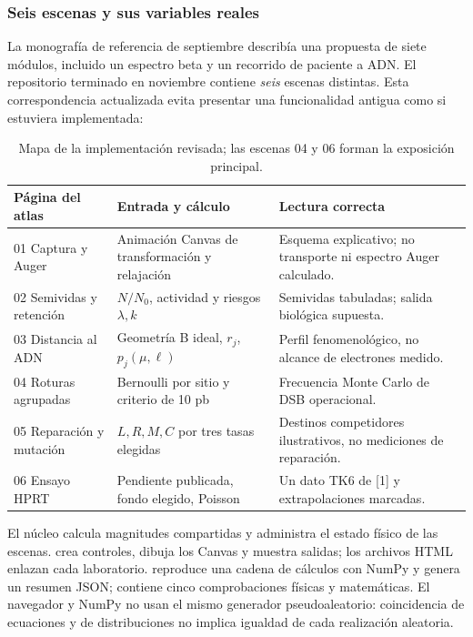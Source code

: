 \documentclass[11pt,a4paper,oneside]{article}
\begin{document}
\subsubsection{Seis escenas y sus variables reales}
La monografía de referencia de septiembre describía una propuesta de siete
módulos, incluido un espectro beta y un recorrido de paciente a ADN. El
repositorio terminado en noviembre contiene \emph{seis} escenas distintas.
Esta correspondencia actualizada evita presentar una funcionalidad antigua
como si estuviera implementada:
\begin{table}[htbp]\centering\footnotesize
\begin{tabularx}{\linewidth}{@{}p{.19\linewidth}p{.35\linewidth}X@{}}
\toprule Página del atlas & Entrada y cálculo & Lectura correcta \\\midrule
01 Captura y Auger & Animación Canvas de transformación y relajación & Esquema explicativo; no transporte ni espectro Auger calculado. \\
02 Semividas y retención & $N/N_0$, actividad y riesgos $\lambda,k$ & Semividas tabuladas; salida biológica supuesta. \\
03 Distancia al ADN & Geometría B ideal, $r_j$, $p_j(\mu,\ell)$ & Perfil fenomenológico, no alcance de electrones medido. \\
04 Roturas agrupadas & Bernoulli por sitio y criterio de 10 pb & Frecuencia Monte Carlo de DSB operacional. \\
05 Reparación y mutación & $L,R,M,C$ por tres tasas elegidas & Destinos competidores ilustrativos, no mediciones de reparación. \\
06 Ensayo HPRT & Pendiente publicada, fondo elegido, Poisson & Un dato TK6 de [1] y extrapolaciones marcadas. \\\bottomrule
\end{tabularx}
\caption{Mapa de la implementación revisada; las escenas 04 y 06 forman la exposición principal.}
\end{table}

El núcleo  calcula magnitudes compartidas y administra
el estado físico de las escenas.  crea controles, dibuja los
Canvas y muestra salidas; los archivos HTML enlazan cada laboratorio.
 reproduce una cadena de cálculos con NumPy y
genera un resumen JSON;  contiene cinco
comprobaciones físicas y matemáticas. El navegador y NumPy no usan el
mismo generador pseudoaleatorio: coincidencia de ecuaciones y de
distribuciones no implica igualdad de cada realización aleatoria.
\end{document}
